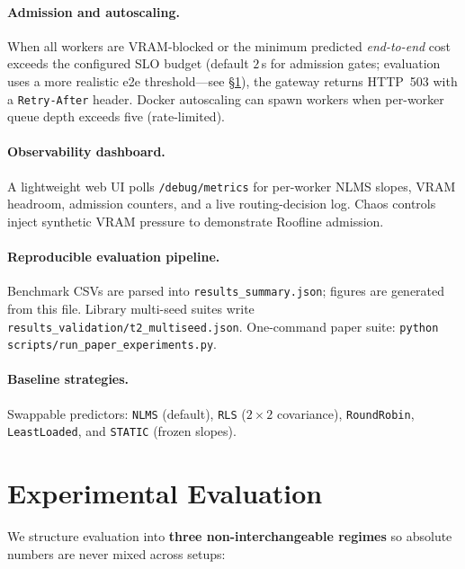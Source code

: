 \documentclass[10pt,twocolumn,letterpaper]{article}
\begin{document}
\paragraph{Admission and autoscaling.}
When all workers are VRAM-blocked or the minimum predicted \emph{end-to-end} cost exceeds the configured SLO budget (default $2$\,s for admission gates; evaluation uses a more realistic e2e threshold---see \S\ref{sec:evaluation}), the gateway returns HTTP~503 with a \texttt{Retry-After} header. Docker autoscaling can spawn workers when per-worker queue depth exceeds five (rate-limited).

\paragraph{Observability dashboard.}
A lightweight web UI polls \texttt{/debug/metrics} for per-worker NLMS slopes, VRAM headroom, admission counters, and a live routing-decision log. Chaos controls inject synthetic VRAM pressure to demonstrate Roofline admission.

\paragraph{Reproducible evaluation pipeline.}
Benchmark CSVs are parsed into \texttt{results\_summary.json}; figures are generated from this file. Library multi-seed suites write \texttt{results\_validation/t2\_multiseed.json}. One-command paper suite: \texttt{python scripts/run\_paper\_experiments.py}.

\paragraph{Baseline strategies.}
Swappable predictors: \texttt{NLMS} (default), \texttt{RLS} ($2{\times}2$ covariance), \texttt{RoundRobin}, \texttt{LeastLoaded}, and \texttt{STATIC} (frozen slopes).


\section{Experimental Evaluation}
\label{sec:evaluation}

We structure evaluation into \textbf{three non-interchangeable regimes} so absolute numbers are never mixed across setups:
\end{document}
